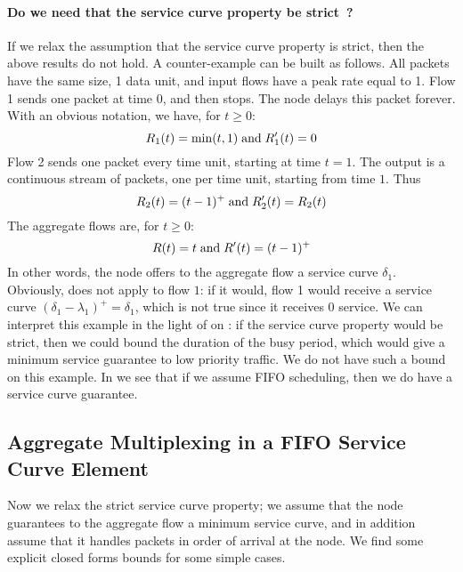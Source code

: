 \paragraph{Do we need that the service curve property be strict~?}
If we relax the assumption that the service curve property is
strict, then the above results do not hold. A counter-example can
be built as follows. All packets have the same size, 1 data unit,
and input flows have a peak rate equal to 1. Flow 1 sends one
packet at time $0$, and then stops. The node delays this packet
forever. With an obvious notation, we have, for $t \geq 0$:
$$R_1(t)= \min(t,1) \mathrm{\; and \; } R'_1(t)=0$$
Flow 2 sends one packet every time unit, starting at time $t=1$.
The output is a continuous stream of packets, one per time unit,
starting from time $1$. Thus
 $$R_2(t)= (t-1)^+ \mathrm{\; and \; }
R'_2(t)=R_2(t)$$ The aggregate flows are, for $t\geq 0$:
 $$R(t) =t \mathrm{\; and \; } R'(t)=(t-1)^+$$
In other words, the node offers to the aggregate flow a service
curve $\delta_1$. Obviously,  does not apply
to flow $1$: if it would, flow 1 would receive a service curve
$(\delta_1 - \lambda_1)^+=\delta_1$, which is not true since it
receives $0$ service. We can interpret this example in the light
of  on : if the service curve
property would be strict, then we could bound the duration of the
busy period, which would give a minimum service guarantee to low
priority traffic. We do not have such a bound on this example. In
 we see that if we assume FIFO scheduling,
then we do have a service curve guarantee.

\subsection{Aggregate Multiplexing in a FIFO Service Curve Element}


Now we relax the strict service curve property; we assume that the
node guarantees to the aggregate flow a minimum service curve, and
in addition assume that it handles packets in order of arrival at
the node. We find some explicit closed forms bounds for some
simple cases.

